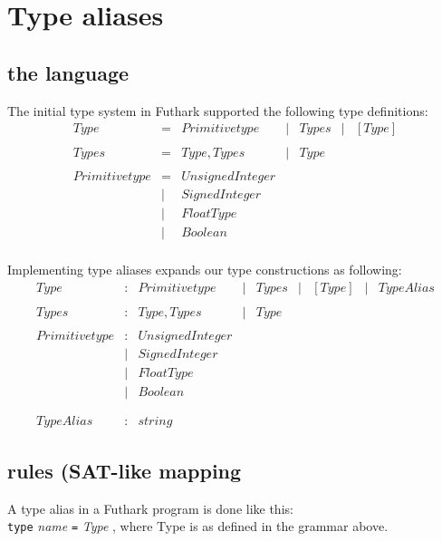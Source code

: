 \section{Type aliases}
\subsection{the language}
The initial type system in Futhark supported the following type definitions:
\begin{align*}
  Type           & = & Primitive type
                 & | & { Types }
                 & | & [ Type ]
  \\
  \\
  Types          & = & Type , Types
                 & | & Type
  \\
  \\
  Primitive type & = & UnsignedInteger \\
                 & | & SignedInteger \\
                 & | & FloatType \\
                 & | & Boolean \\
\end{align*}

Implementing type aliases expands our type constructions as following:
\begin{align*}
  Type           & : & Primitive type
                 & | & { Types }
                 & | & [ Type ]
                 & | & TypeAlias
  \\
  \\
  Types          & : & Type , Types
                 & | & Type
  \\
  \\
  Primitive type & : & UnsignedInteger \\
                 & | & SignedInteger \\
                 & | & FloatType \\
                 & | & Boolean \\
  \\
  \\
  TypeAlias      & : & string
\end{align*}

\subsection{rules (SAT-like mapping }
A type alias in a Futhark program is done like this:\\
\indent \texttt{type} \textit{name} \texttt{=} \textit{Type} , where Type is as
defined in the grammar above.
